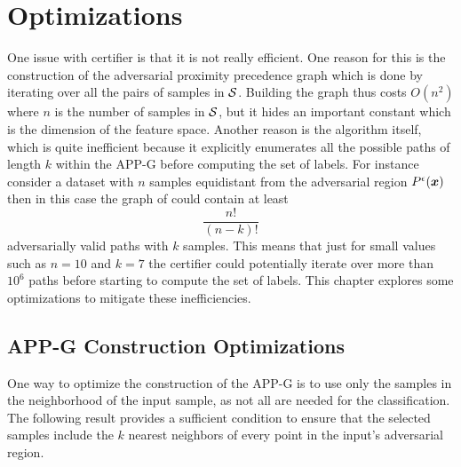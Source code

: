 
\chapter{Optimizations}
\label{chp:optimizations}

One issue with certifier is that it is not really efficient. One reason for this is the construction of the adversarial proximity precedence graph which is done by iterating over all the pairs of samples in $\mathcal{S}$.  Building the graph thus costs $O(n^2)$ where $n$ is the number of samples in $\mathcal{S}$, but it hides an important constant which is the dimension of the feature space. Another reason is the algorithm itself, which is quite inefficient because it explicitly enumerates all the possible paths of length $k$ within the \acs{APP-G} before computing the set of labels. For instance consider a dataset with $n$ samples equidistant from the adversarial region $P^{\epsilon}(\bm{x})$ then in this case the graph of could contain at least
\[
  \frac{n!}{(n-k)!}
\]
adversarially valid paths with $k$ samples. This means that just for small values such as $n=10$ and $k=7$ the certifier could potentially iterate over more than $10^6$ paths before starting to compute the set of labels. This chapter explores some optimizations to mitigate these inefficiencies.

\section{\acs{APP-G} Construction Optimizations}
\label{sec:graph-construction-optimizations}

One way to optimize the construction of the \acs{APP-G} is to use only the samples in the neighborhood of the input sample, as not all are needed for the classification. The following result provides a sufficient condition to ensure that the selected samples include the $k$ nearest neighbors of every point in the input's adversarial region.

